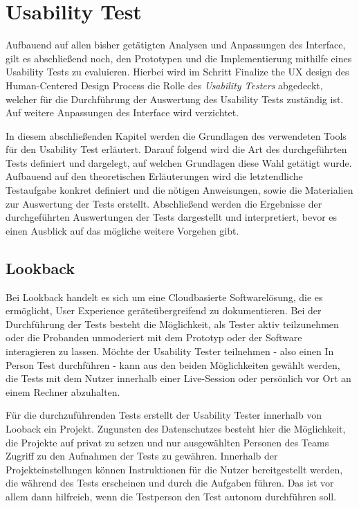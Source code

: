 \chapter{Usability Test}\label{ch:outlook}

Aufbauend auf allen bisher getätigten Analysen und Anpassungen des Interface, gilt es abschließend noch, den Prototypen und die Implementierung mithilfe eines Usability Tests zu evaluieren.
Hierbei wird im Schritt \glqq Finalize the UX design\grqq{} des Human-Centered Design Process die Rolle des \textit{Usability Testers} abgedeckt, welcher für die Durchführung der Auswertung des Usability Tests zuständig ist.
Auf weitere Anpassungen des Interface wird verzichtet.

In diesem abschließenden Kapitel werden die Grundlagen des verwendeten Tools für den Usability Test erläutert.
Darauf folgend wird die Art des durchgeführten Tests definiert und dargelegt, auf welchen Grundlagen diese Wahl getätigt wurde.
Aufbauend auf den theoretischen Erläuterungen wird die letztendliche Testaufgabe konkret definiert und die nötigen Anweisungen, sowie die Materialien zur Auswertung der Tests erstellt.
Abschließend werden die Ergebnisse der durchgeführten Auswertungen der Tests dargestellt und interpretiert, bevor es einen Ausblick auf das mögliche weitere Vorgehen gibt.

\section{Lookback}

Bei Lookback handelt es sich um eine Cloudbasierte Softwarelösung, die es ermöglicht, User Experience geräteübergreifend zu dokumentieren.
Bei der Durchführung der Tests besteht die Möglichkeit, als Tester aktiv teilzunehmen oder die Probanden unmoderiert mit dem Prototyp oder der Software interagieren zu lassen.
Möchte der Usability Tester teilnehmen -  also einen \glqq In Person\grqq{} Test durchführen - kann aus den beiden Möglichkeiten gewählt werden, die Tests mit dem Nutzer innerhalb einer Live-Session oder persönlich vor Ort an einem Rechner abzuhalten.

Für die durchzuführenden Tests erstellt der Usability Tester innerhalb von Looback ein Projekt.
Zugunsten des Datenschutzes besteht hier die Möglichkeit, die Projekte auf privat zu setzen und nur ausgewählten Personen des Teams Zugriff zu den Aufnahmen  der Tests zu gewähren.
Innerhalb der Projekteinstellungen können Instruktionen für die Nutzer bereitgestellt werden, die während des Tests erscheinen und durch die Aufgaben führen.
Das ist vor allem dann hilfreich, wenn die Testperson den Test autonom durchführen soll.

